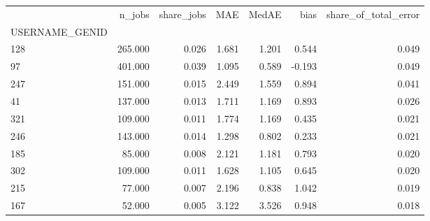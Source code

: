 \begin{tabular}{lrrrrrr}
\toprule
 & n_jobs & share_jobs & MAE & MedAE & bias & share_of_total_error \\
USERNAME_GENID &  &  &  &  &  &  \\
\midrule
128 & 265.000 & 0.026 & 1.681 & 1.201 & 0.544 & 0.049 \\
97 & 401.000 & 0.039 & 1.095 & 0.589 & -0.193 & 0.049 \\
247 & 151.000 & 0.015 & 2.449 & 1.559 & 0.894 & 0.041 \\
41 & 137.000 & 0.013 & 1.711 & 1.169 & 0.893 & 0.026 \\
321 & 109.000 & 0.011 & 1.774 & 1.169 & 0.435 & 0.021 \\
246 & 143.000 & 0.014 & 1.298 & 0.802 & 0.233 & 0.021 \\
185 & 85.000 & 0.008 & 2.121 & 1.181 & 0.793 & 0.020 \\
302 & 109.000 & 0.011 & 1.628 & 1.105 & 0.645 & 0.020 \\
215 & 77.000 & 0.007 & 2.196 & 0.838 & 1.042 & 0.019 \\
167 & 52.000 & 0.005 & 3.122 & 3.526 & 0.948 & 0.018 \\
\bottomrule
\end{tabular}
